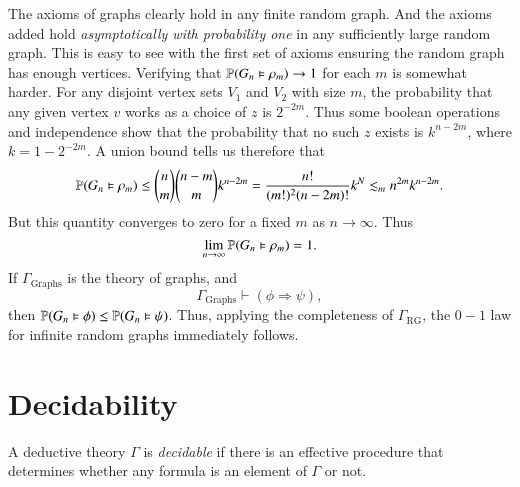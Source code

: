 \begin{example}
    The axioms of graphs clearly hold in any finite random graph. And the axioms added hold \emph{asymptotically with probability one} in any sufficiently large random graph. This is easy to see with the first set of axioms ensuring the random graph has enough vertices. Verifying that $\operatorname{\mathbb{P}}(G_n \vDash \rho_m) \to 1$ for each $m$ is somewhat harder. For any disjoint vertex sets $V_1$ and $V_2$ with size $m$, the probability that any given vertex $v$ works as a choice of $z$ is $2^{-2m}$. Thus some boolean operations and independence show that the probability that no such $z$ exists is $k^{n-2m}$, where $k = 1 - 2^{-2m}$. A union bound tells us therefore that
    \[ \operatorname{\mathbb{P}}(G_n \vDash \rho_m) \leq {n \choose m} {n - m \choose m} k^{n-2m} = \frac{n!}{(m!)^2 (n-2m)!} k^N \lesssim_m n^{2m} k^{n-2m}. \]
    But this quantity converges to zero for a fixed $m$ as $n \to \infty$. Thus
    \[ \lim_{n \to \infty} \operatorname{\mathbb{P}}(G_n \vDash \rho_m) = 1. \]
    If $\Gamma_{\text{Graphs}}$ is the theory of graphs, and
    \[ \Gamma_{\text{Graphs}} \vdash (\phi \Rightarrow \psi), \]
    then $\operatorname{\mathbb{P}}(G_n \vDash \phi) \leq \operatorname{\mathbb{P}}(G_n \vDash \psi)$. Thus, applying the completeness of $\Gamma_{\text{RG}}$, the $0-1$ law for infinite random graphs immediately follows.
\end{example}

\section{Decidability}

A deductive theory $\Gamma$ is \emph{decidable} if there is an effective procedure that determines whether any formula is an element of $\Gamma$ or not.

